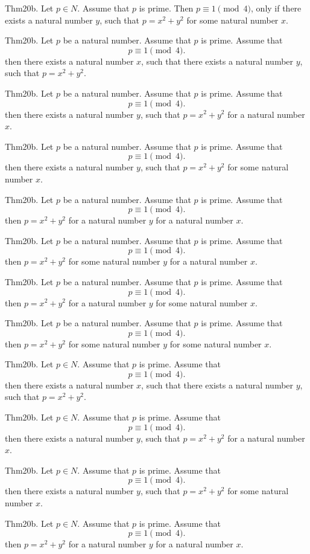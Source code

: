 \documentclass{article}
\begin{document}
Thm20b. Let $p \in N$. Assume that $p$ is prime. Then $p \equiv 1 \pmod{ 4}$, only if there exists a natural number $y$, such that $p = x ^{ 2}+ y ^{ 2}$ for some natural number $x$.

Thm20b. Let $p$ be a natural number. Assume that $p$ is prime. Assume that $$p \equiv 1 \pmod{ 4}.$$ then there exists a natural number $x$, such that there exists a natural number $y$, such that $p = x ^{ 2}+ y ^{ 2}$.

Thm20b. Let $p$ be a natural number. Assume that $p$ is prime. Assume that $$p \equiv 1 \pmod{ 4}.$$ then there exists a natural number $y$, such that $p = x ^{ 2}+ y ^{ 2}$ for a natural number $x$.

Thm20b. Let $p$ be a natural number. Assume that $p$ is prime. Assume that $$p \equiv 1 \pmod{ 4}.$$ then there exists a natural number $y$, such that $p = x ^{ 2}+ y ^{ 2}$ for some natural number $x$.

Thm20b. Let $p$ be a natural number. Assume that $p$ is prime. Assume that $$p \equiv 1 \pmod{ 4}.$$ then $p = x ^{ 2}+ y ^{ 2}$ for a natural number $y$ for a natural number $x$.

Thm20b. Let $p$ be a natural number. Assume that $p$ is prime. Assume that $$p \equiv 1 \pmod{ 4}.$$ then $p = x ^{ 2}+ y ^{ 2}$ for some natural number $y$ for a natural number $x$.

Thm20b. Let $p$ be a natural number. Assume that $p$ is prime. Assume that $$p \equiv 1 \pmod{ 4}.$$ then $p = x ^{ 2}+ y ^{ 2}$ for a natural number $y$ for some natural number $x$.

Thm20b. Let $p$ be a natural number. Assume that $p$ is prime. Assume that $$p \equiv 1 \pmod{ 4}.$$ then $p = x ^{ 2}+ y ^{ 2}$ for some natural number $y$ for some natural number $x$.

Thm20b. Let $p \in N$. Assume that $p$ is prime. Assume that $$p \equiv 1 \pmod{ 4}.$$ then there exists a natural number $x$, such that there exists a natural number $y$, such that $p = x ^{ 2}+ y ^{ 2}$.

Thm20b. Let $p \in N$. Assume that $p$ is prime. Assume that $$p \equiv 1 \pmod{ 4}.$$ then there exists a natural number $y$, such that $p = x ^{ 2}+ y ^{ 2}$ for a natural number $x$.

Thm20b. Let $p \in N$. Assume that $p$ is prime. Assume that $$p \equiv 1 \pmod{ 4}.$$ then there exists a natural number $y$, such that $p = x ^{ 2}+ y ^{ 2}$ for some natural number $x$.

Thm20b. Let $p \in N$. Assume that $p$ is prime. Assume that $$p \equiv 1 \pmod{ 4}.$$ then $p = x ^{ 2}+ y ^{ 2}$ for a natural number $y$ for a natural number $x$.
\end{document}

